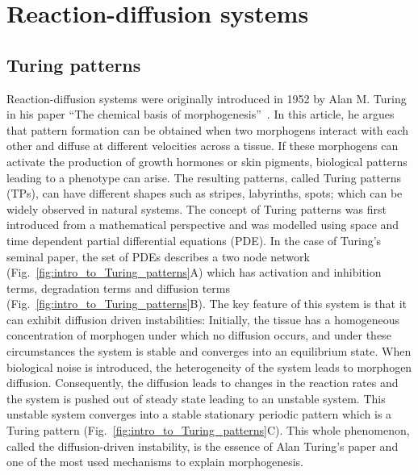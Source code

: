

\section{Reaction-diffusion systems}
\subsection{Turing patterns}
Reaction-diffusion systems were originally introduced in 1952 by Alan M. Turing in his paper “The chemical basis of morphogenesis”~\parencite{Turing1952}.
In this article, he argues that pattern formation can be obtained when two morphogens interact with each other and diffuse at different
velocities across a tissue.
If these morphogens can activate the production of growth hormones or skin pigments, biological patterns leading to a phenotype can arise.
The resulting patterns, called Turing patterns (TPs), can have different shapes such as stripes, labyrinths, spots; which can be widely observed in natural systems.
The concept of Turing patterns was first introduced from a mathematical perspective and was modelled using space and time dependent partial differential equations (PDE). In the case of Turing’s seminal paper, the set of PDEs describes a two node network (Fig.~\ref{fig:intro_to_Turing_patterns}A) which has activation and inhibition terms, degradation terms and diffusion terms (Fig.~\ref{fig:intro_to_Turing_patterns}B).
The key feature of this system is that it can exhibit diffusion driven instabilities: Initially, the tissue has a homogeneous concentration of morphogen under which no diffusion occurs, and under these circumstances the system is stable and converges into an equilibrium state.
When biological noise is introduced, the heterogeneity of the system leads to morphogen diffusion.
Consequently, the diffusion leads to changes in the reaction rates and the system is pushed out of steady state leading to an unstable system.
This unstable system converges into a stable stationary periodic pattern which is a Turing pattern (Fig.~\ref{fig:intro_to_Turing_patterns}C).
This whole phenomenon, called the diffusion-driven instability, is the essence of Alan Turing’s paper and one of the most used mechanisms to explain morphogenesis.

